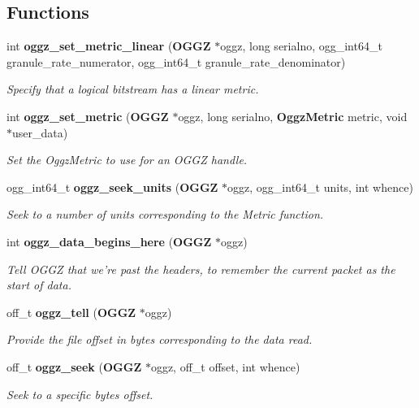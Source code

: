 \subsection*{Functions}
\begin{CompactItemize}
\item 
int {\bf oggz\_\-set\_\-metric\_\-linear} ({\bf OGGZ} $\ast$oggz, long serialno, ogg\_\-int64\_\-t granule\_\-rate\_\-numerator, ogg\_\-int64\_\-t granule\_\-rate\_\-denominator)
\begin{CompactList}\small\item\em Specify that a logical bitstream has a linear metric. \item\end{CompactList}\item 
int {\bf oggz\_\-set\_\-metric} ({\bf OGGZ} $\ast$oggz, long serialno, {\bf Oggz\-Metric} metric, void $\ast$user\_\-data)
\begin{CompactList}\small\item\em Set the Oggz\-Metric to use for an OGGZ handle. \item\end{CompactList}\item 
ogg\_\-int64\_\-t {\bf oggz\_\-seek\_\-units} ({\bf OGGZ} $\ast$oggz, ogg\_\-int64\_\-t units, int whence)
\begin{CompactList}\small\item\em Seek to a number of units corresponding to the Metric function. \item\end{CompactList}\item 
int {\bf oggz\_\-data\_\-begins\_\-here} ({\bf OGGZ} $\ast$oggz)
\begin{CompactList}\small\item\em Tell OGGZ that we're past the headers, to remember the current packet as the start of data. \item\end{CompactList}\item 
off\_\-t {\bf oggz\_\-tell} ({\bf OGGZ} $\ast$oggz)
\begin{CompactList}\small\item\em Provide the file offset in bytes corresponding to the data read. \item\end{CompactList}\item 
off\_\-t {\bf oggz\_\-seek} ({\bf OGGZ} $\ast$oggz, off\_\-t offset, int whence)
\begin{CompactList}\small\item\em Seek to a specific bytes offset. \item\end{CompactList}\end{CompactItemize}


